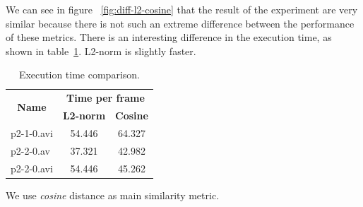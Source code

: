 We can see in figure ~\ref{fig:diff-l2-cosine} that the result of the experiment are very similar because there is not such an extreme difference between the performance of these metrics. There is an interesting difference in the execution time, as shown in table~\ref{table:dis-time}. L2-norm is slightly faster.  

\begin{table}[H]
\centering
\begin{tabular}{|l|c|c|}
\hline
\multicolumn{1}{|c|}{\multirow{2}{*}{\textbf{Name}}} & \multicolumn{2}{c|}{\textbf{Time per frame}} \\ \cline{2-3} 
\multicolumn{1}{|c|}{} & \textbf{L2-norm} & \textbf{Cosine} \\ \hline
p2-1-0.avi & 54.446 & 64.327 \\ \hline
p2-2-0.av & 37.321 & 42.982 \\ \hline
p2-2-0.avi & 54.446 & 45.262 \\ \hline
\end{tabular}
\caption{Execution time comparison.}
\label{table:dis-time}
\end{table}

We use \textit{cosine} distance as main similarity metric.
